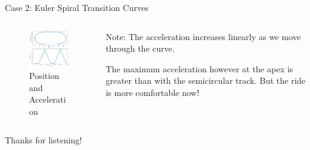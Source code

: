 \documentclass{beamer}
\begin{document}
\begin{frame}{Case 2: Euler Spiral Transition Curves}
	\begin{columns}
		\begin{column}{0.8\textwidth}			
			\begin{figure}
				\caption{Position and Acceleration}
				\centering
				\includegraphics[width=70mm, scale=0.2]{euler_track.png}
			\end{figure}
		\end{column}
		\begin{column}{0.33\textwidth}
			Note: The acceleration increases linearly as we move through the curve.
			
			The maximum acceleration however at the apex is greater than with the semicircular track. But the ride is more comfortable now!
					
		\end{column}
	\end{columns}

\end{frame}



\begin{frame}
	\centering
	Thanks for listening!
	 
\end{frame}
\end{document}
